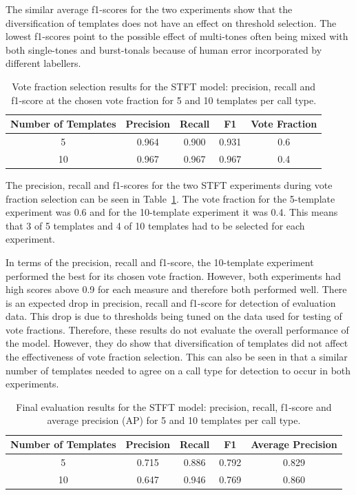 The similar average f1-scores for the two experiments show that the diversification of templates does not have an effect on threshold selection. 
The lowest f1-scores point to the possible effect of multi-tones often being mixed with 
both single-tones and burst-tonals because of human error incorporated by different labellers. 

\begin{table}[H]
    \caption{Vote fraction selection results for the STFT model: precision, recall and f1-score 
    at the chosen vote fraction for 5 and 10 templates per call type.}
    \footnotesize
    \setlength{\tabcolsep}{3pt}
    \centering
    \begin{tabular}{ccccc}
        \toprule
        Number of Templates & Precision & Recall & F1 & Vote Fraction\\
        \midrule
        5 & 0.964 & 0.900 & 0.931 & 0.6 \\
        10 & 0.967 & 0.967 & 0.967 & 0.4 \\
        \bottomrule
    \end{tabular}\label{tab:stft_vote_results}
\end{table}

The precision, recall and f1-scores for the two \acs{STFT} experiments during vote fraction selection can be seen in Table~\ref{tab:stft_vote_results}.
The vote fraction for the 5-template experiment was 0.6 and for the 10-template 
experiment it was 0.4. This means that 3 of 5 templates and 4 of 10 templates had to be selected for each experiment.

In terms of the precision, recall and f1-score, the 10-template experiment performed the best for its chosen vote fraction. However, both experiments had high scores above 0.9 
for each measure and therefore both performed well. There is an expected drop in precision, recall and f1-score for detection of evaluation data. 
This drop is due to thresholds being tuned on the data used for testing of vote fractions. Therefore, these results do not evaluate the overall performance of the model. 
However, they do show that diversification of templates did not affect the effectiveness of vote fraction selection. This can also be seen in that a similar number of templates 
needed to agree on a call type for detection to occur in both experiments.

\begin{table}[H]
    \caption{Final evaluation results for the STFT model: precision, recall, f1-score and 
    average precision (AP) for 5 and 10 templates per call type.}
    \footnotesize
    \setlength{\tabcolsep}{3pt}
    \centering
    \begin{tabular}{ccccc}
        \toprule
        Number of Templates & Precision & Recall & F1 & Average Precision \\
        \midrule
        5  & 0.715 & 0.886 & 0.792 & 0.829 \\
        10 & 0.647 & 0.946 & 0.769 & 0.860 \\
        \bottomrule
    \end{tabular}\label{tab:stft_test_results}
\end{table}


